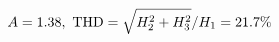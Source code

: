 \documentclass[preview]{standalone}
\begin{document}
\begin{align*}
\special{dvisvgm:raw <g id='unique000'>}A=1.38,\ \text{THD}=\sqrt{H_2^2+H_3^2}/H_1=21.7\%\special{dvisvgm:raw </g>}
\end{align*}
\end{document}
